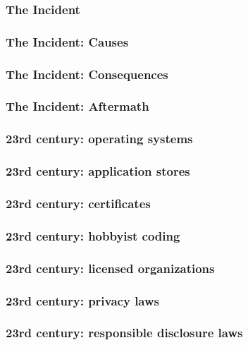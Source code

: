 \begin{frame}[fragile]
\frametitle{The Incident}

\end{frame}

\begin{frame}[fragile]
\frametitle{The Incident: Causes}

\end{frame}

\begin{frame}[fragile]
\frametitle{The Incident: Consequences}

\end{frame}

\begin{frame}[fragile]
\frametitle{The Incident: Aftermath}

\end{frame}

\begin{frame}[fragile]
\frametitle{23rd century: operating systems}

\end{frame}

\begin{frame}[fragile]
\frametitle{23rd century: application stores}

\end{frame}

\begin{frame}[fragile]
\frametitle{23rd century: certificates}

\end{frame}

\begin{frame}[fragile]
\frametitle{23rd century: hobbyist coding}

\end{frame}

\begin{frame}[fragile]
\frametitle{23rd century: licensed organizations}

\end{frame}

\begin{frame}[fragile]
\frametitle{23rd century: privacy laws}

\end{frame}

\begin{frame}[fragile]
\frametitle{23rd century: responsible disclosure laws}

\end{frame}

